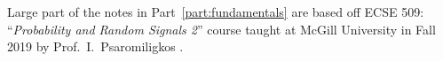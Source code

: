 Large part of the notes in Part~\ref{part:fundamentals} are based off ECSE 509: ``\emph{Probability and Random Signals 2}'' course taught at McGill University in Fall 2019 by Prof.~I.~Psaromiligkos \cite{psaromiligkos_slides_2019}.